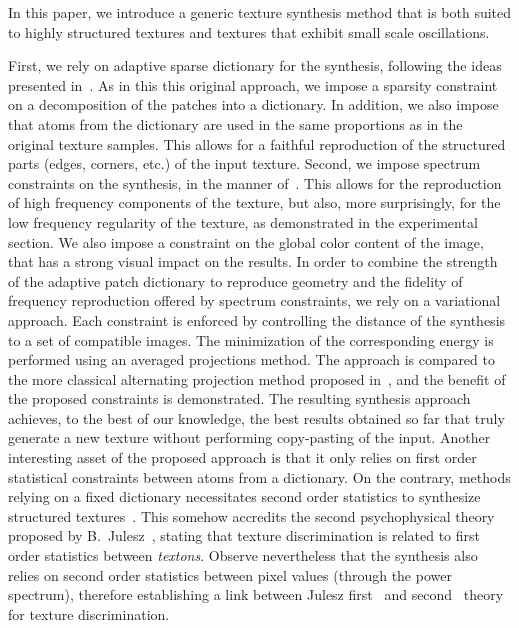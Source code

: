 In this paper, we introduce a generic texture synthesis me\-thod that is both suited to highly structured textures and textures that exhibit small scale oscillations.

First, we rely on adaptive sparse dictionary for the synthesis, following the ideas presented in~\cite{peyre2009sparse}.
As in this this original approach, we impose a sparsity constraint on a decomposition of the patches into a dictionary.
In addition, we also impose that atoms from the dictionary are used in the same proportions as in the original texture samples.
This allows for a faithful reproduction of the structured parts (ed\-ges, corners, etc.) of the input texture.
Second, we impose spectrum constraints on the synthesis, in the manner of~\cite{galerne2011random}.
This allows for the reproduction of high frequency components of the texture, but also, more surprisingly, for the low frequency regularity of the texture, as demonstrated in the experimental section.
We also impose a constraint on the global color content of the image, that has a strong visual impact on the results.
In order to combine the strength of the adaptive patch dictionary to reproduce geometry and the fidelity of frequency reproduction offered by spectrum constraints, we rely on a variational approach.
Each constraint is enforced by controlling the distance of the synthesis to a set of compatible images.
The minimization of the corresponding energy is performed using an averaged projections method.
The approach is compared to the more classical alternating projection method proposed in~\cite{portilla2000parametric}, and the benefit of the proposed constraints is demonstrated.
The resulting synthesis approach achieves, to the best of our knowledge, the best results obtained so far that truly generate a new texture without performing copy-pasting of the input.
Another interesting asset of the proposed approach is that it only relies on first order statistical constraints between atoms from a dictionary.
On the contrary, methods relying on a fixed dictionary necessitates second order statistics to synthesize structured textures~\cite{portilla2000parametric}.
This somehow accredits the second psychophysical theory proposed by B.~Julesz~\cite{Julesz1981}, stating that texture discrimination is related to first order statistics between {\it textons}.
Observe nevertheless that the synthesis also relies on second order statistics between pixel values (through the power spectrum), the\-re\-fore establishing a link between Julesz first~\cite{julesz1962visual} and second~\cite{Julesz1981} theory for texture discrimination.

